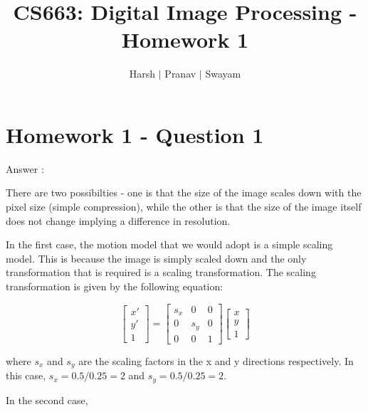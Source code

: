 \documentclass{article}
\title{CS663: Digital Image Processing - Homework 1}
\author{Harsh $\vert$ Pranav $\vert$ Swayam}
\begin{document}
\maketitle
\section{Homework 1 - Question 1}

Answer : 

There are two possibilties - one is that the size of the image scales down with the pixel size (simple compression), while the other is that the size of the image itself does not change implying a difference in resolution.

In the first case, the motion model that we would adopt is a simple scaling model. This is because the image is simply scaled down and the only transformation that is required is a scaling transformation. The scaling transformation is given by the following equation:

\begin{equation}
\begin{bmatrix}
x' \\
y' \\
1
\end{bmatrix}
=
\begin{bmatrix}
s_x & 0 & 0 \\
0 & s_y & 0 \\
0 & 0 & 1
\end{bmatrix}
\begin{bmatrix}
x \\
y \\
1
\end{bmatrix}
\end{equation}

where $s_x$ and $s_y$ are the scaling factors in the x and y directions respectively. In this case, $s_x = 0.5/0.25 = 2$ and $s_y = 0.5/0.25 = 2$.

In the second case, 
\end{document}
